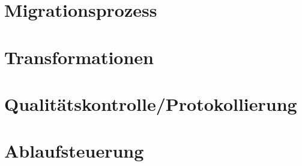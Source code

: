 \section{Migrationsprozess}
\section{Transformationen}
\section{Qualitätskontrolle/Protokollierung}
\section{Ablaufsteuerung}

